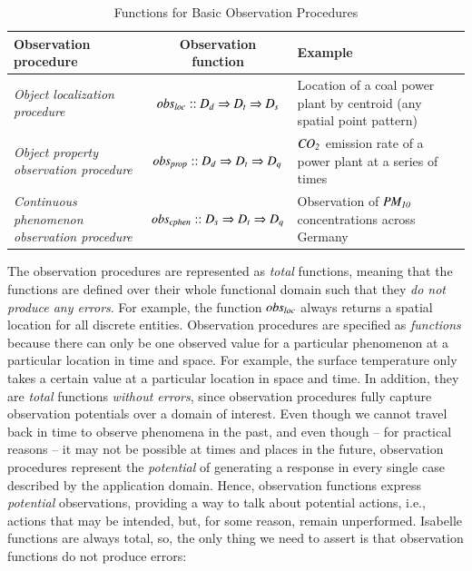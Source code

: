 \documentclass[final,authoryear,1p,times]{elsarticle}
\begin{document}
\begin{table}[htb]
\caption{Functions for Basic Observation Procedures}
\label{ObsTable}
\begin{tabular}[h]{|p{3.5cm}|c|p{5cm}|}
			\hline
			\textbf{Observation procedure} & \textbf{Observation function} &  \textbf{Example} \\
			\hline
			\textit{Object localization procedure} & ${\it obs_{loc} ::  D_d \Rightarrow D_t \Rightarrow D_s }$&  Location of a coal power plant by centroid (any spatial point pattern) \\
			\hline			
\textit{Object property observation procedure} & ${\it obs_{prop} ::  D_d \Rightarrow D_t \Rightarrow D_q}$ &  ${\it CO_2}$ emission rate of a power plant at a series of  times \\
			\hline			
\textit{Continuous phenomenon observation procedure} & ${\it obs_{cphen} ::  D_s \Rightarrow D_t \Rightarrow D_q}$ &  Observation of ${\it PM_{10}}$ concentrations across Germany \\
			\hline
\end{tabular}
\end{table}

The observation procedures are represented as \textit{total} functions, meaning that the functions are defined over their whole functional domain such that they \textit{do not produce any errors}. For example, the function $\it{{obs}_{loc}}$ always returns a spatial location for all discrete entities. Observation procedures are specified as \textit{functions} because there can only be one observed value for a particular phenomenon at a particular location in time and space. For example, the surface temperature only takes a certain value at a particular location in space and time. In addition, they are \textit{total} functions \textit{without errors}, since observation procedures fully capture observation potentials over a domain of interest. Even though we cannot travel back in time to observe phenomena in the past, and even though -- for practical reasons -- it may not be possible at times and places in the future, observation procedures represent the \textit{potential} of generating a response in every single case described by the application domain. Hence, observation functions express \textit{potential} observations, providing a way to talk about potential actions, i.e., actions that may be intended, but, for some reason, remain unperformed. Isabelle functions are always total, so, the only thing we need to assert is that observation functions do not produce errors: 
\end{document}
